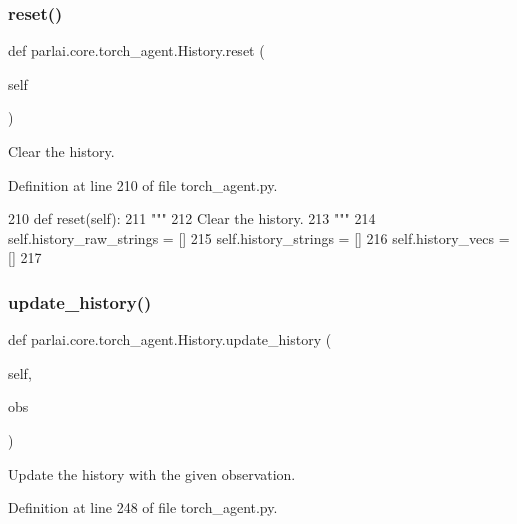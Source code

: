 \subsubsection{\texorpdfstring{reset()}{reset()}}
{\footnotesize\ttfamily def parlai.\+core.\+torch\+\_\+agent.\+History.\+reset (\begin{DoxyParamCaption}\item[{}]{self }\end{DoxyParamCaption})}

\begin{DoxyVerb}Clear the history.
\end{DoxyVerb}
 

Definition at line 210 of file torch\+\_\+agent.\+py.


\begin{DoxyCode}
210     \textcolor{keyword}{def }reset(self):
211         \textcolor{stringliteral}{"""}
212 \textcolor{stringliteral}{        Clear the history.}
213 \textcolor{stringliteral}{        """}
214         self.history\_raw\_strings = []
215         self.history\_strings = []
216         self.history\_vecs = []
217 
\end{DoxyCode}
\mbox{\label{classparlai_1_1core_1_1torch__agent_1_1History_a433d24b0b497a71ef92ac700f5a54065}} 
\subsubsection{\texorpdfstring{update\+\_\+history()}{update\_history()}}
{\footnotesize\ttfamily def parlai.\+core.\+torch\+\_\+agent.\+History.\+update\+\_\+history (\begin{DoxyParamCaption}\item[{}]{self,  }\item[{}]{obs }\end{DoxyParamCaption})}

\begin{DoxyVerb}Update the history with the given observation.
\end{DoxyVerb}
 

Definition at line 248 of file torch\+\_\+agent.\+py.


